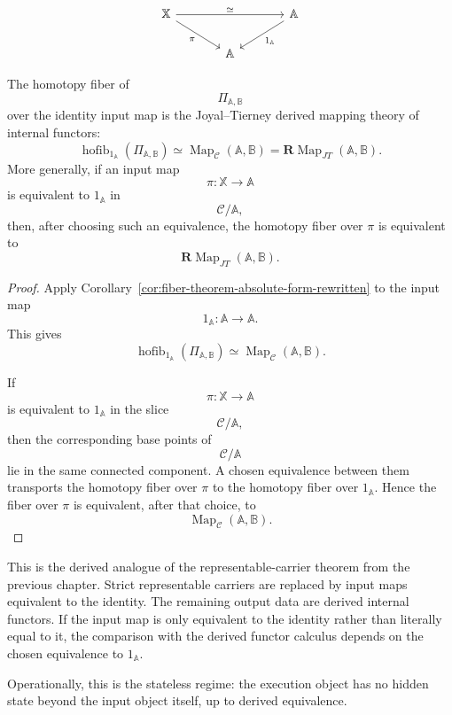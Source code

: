 \[
\begin{tikzcd}[column sep=large]
\mathbb X
\arrow[rr, "\simeq"]
\arrow[dr, "\pi"']
&
&
\mathbb A
\arrow[dl, "1_{\mathbb A}"]
\\
&
\mathbb A
&
\end{tikzcd}
\]

\begin{proposition}
\label{prop:stateless-derived-internal-functors-rewritten}
The homotopy fiber of
\[
\Pi_{\mathbb A,\mathbb B}
\]
over the identity input map is the Joyal--Tierney derived mapping theory
of internal functors:
\[
\operatorname{hofib}_{1_{\mathbb A}}
\left(
\Pi_{\mathbb A,\mathbb B}
\right)
\simeq
\operatorname{Map}_{\mathcal C}(\mathbb A,\mathbb B)
=
\mathbf R\!\operatorname{Map}_{JT}(\mathbb A,\mathbb B).
\]
More generally, if an input map
\[
\pi:\mathbb X\to\mathbb A
\]
is equivalent to \(1_{\mathbb A}\) in
\[
\mathcal C/\mathbb A,
\]
then, after choosing such an equivalence, the homotopy fiber over
\(\pi\) is equivalent to
\[
\mathbf R\!\operatorname{Map}_{JT}(\mathbb A,\mathbb B).
\]
\end{proposition}

\begin{proof}
Apply Corollary~\ref{cor:fiber-theorem-absolute-form-rewritten} to the
input map
\[
1_{\mathbb A}:\mathbb A\to\mathbb A.
\]
This gives
\[
\operatorname{hofib}_{1_{\mathbb A}}
\left(
\Pi_{\mathbb A,\mathbb B}
\right)
\simeq
\operatorname{Map}_{\mathcal C}(\mathbb A,\mathbb B).
\]

If
\[
\pi:\mathbb X\to\mathbb A
\]
is equivalent to \(1_{\mathbb A}\) in the slice
\[
\mathcal C/\mathbb A,
\]
then the corresponding base points of
\[
\mathcal C/\mathbb A
\]
lie in the same connected component. A chosen equivalence between them
transports the homotopy fiber over \(\pi\) to the homotopy fiber over
\(1_{\mathbb A}\). Hence the fiber over \(\pi\) is equivalent, after that
choice, to
\[
\operatorname{Map}_{\mathcal C}(\mathbb A,\mathbb B).
\]
\end{proof}

\begin{remark}
\label{rem:derived-representable-analogue-rewritten}
This is the derived analogue of the representable-carrier theorem from
the previous chapter. Strict representable carriers are replaced by
input maps equivalent to the identity. The remaining output data are
derived internal functors. If the input map is only equivalent to the
identity rather than literally equal to it, the comparison with the
derived functor calculus depends on the chosen equivalence to
\(1_{\mathbb A}\).

Operationally, this is the stateless regime: the execution object has no
hidden state beyond the input object itself, up to derived equivalence.
\end{remark}


